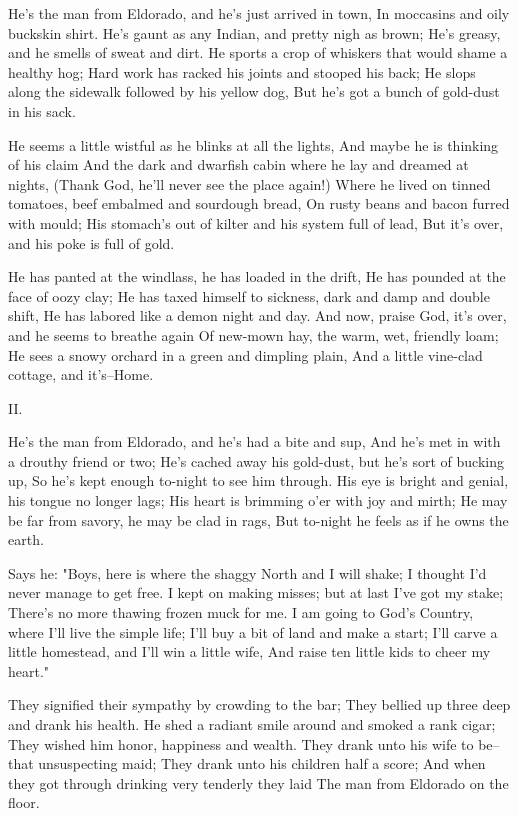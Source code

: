 
\begin{poemblock}
 He's the man from Eldorado, and he's just arrived in town,
  In moccasins and oily buckskin shirt.
 He's gaunt as any Indian, and pretty nigh as brown;
  He's greasy, and he smells of sweat and dirt.
 He sports a crop of whiskers that would shame a healthy hog;
  Hard work has racked his joints and stooped his back;
 He slops along the sidewalk followed by his yellow dog,
  But he's got a bunch of gold-dust in his sack.

 He seems a little wistful as he blinks at all the lights,
  And maybe he is thinking of his claim
 And the dark and dwarfish cabin where he lay and dreamed at nights,
  (Thank God, he'll never see the place again!)
 Where he lived on tinned tomatoes, beef embalmed and sourdough bread,
  On rusty beans and bacon furred with mould;
 His stomach's out of kilter and his system full of lead,
  But it's over, and his poke is full of gold.

 He has panted at the windlass, he has loaded in the drift,
  He has pounded at the face of oozy clay;
 He has taxed himself to sickness, dark and damp and double shift,
  He has labored like a demon night and day.
 And now, praise God, it's over, and he seems to breathe again
  Of new-mown hay, the warm, wet, friendly loam;
 He sees a snowy orchard in a green and dimpling plain,
  And a little vine-clad cottage, and it's--Home.


 II.

 He's the man from Eldorado, and he's had a bite and sup,
  And he's met in with a drouthy friend or two;
 He's cached away his gold-dust, but he's sort of bucking up,
  So he's kept enough to-night to see him through.
 His eye is bright and genial, his tongue no longer lags;
  His heart is brimming o'er with joy and mirth;
 He may be far from savory, he may be clad in rags,
  But to-night he feels as if he owns the earth.

 Says he:  "Boys, here is where the shaggy North and I will shake;
  I thought I'd never manage to get free.
 I kept on making misses; but at last I've got my stake;
  There's no more thawing frozen muck for me.
 I am going to God's Country, where I'll live the simple life;
  I'll buy a bit of land and make a start;
 I'll carve a little homestead, and I'll win a little wife,
  And raise ten little kids to cheer my heart."

 They signified their sympathy by crowding to the bar;
  They bellied up three deep and drank his health.
 He shed a radiant smile around and smoked a rank cigar;
  They wished him honor, happiness and wealth.
 They drank unto his wife to be--that unsuspecting maid;
  They drank unto his children half a score;
 And when they got through drinking very tenderly they laid
  The man from Eldorado on the floor.



\end{poemblock}
